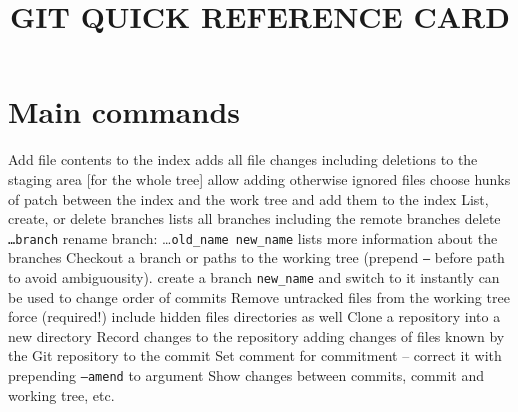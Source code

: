 
\def\cmdOptLl#1#2{
    \hsize=8.5cm
    \vbox {
        \hbox{
      \hskip 15pt
      \noindent\cmd{\tt--#1}
      \hfil
        }%
        \hskip 70pt  %
        \hbox to 5.9cm {%
            \hfuzz = 5pt
            \hfil
            \hsize=5.9cm
            \vtop{
                {#2}
            }}
    }%
    \par
    \vskip 0.14cm
}


\title{GIT QUICK REFERENCE CARD}

\shortintro

\section{Main commands}
	{Add file contents to the index}
	{adds all file changes including deletions to the staging area [for the whole tree]}
	{allow adding otherwise ignored files}
	{choose hunks of patch between the index and the work tree and add them to the index}
	{List, create, or delete branches}
	{lists all branches including the remote branches}
	{delete {\tt \dots branch}}
	{rename branch: \dots {\tt old\_name new\_name}}
	{lists more information about the branches}
	{Checkout a branch or paths to the working tree (prepend {\tt --} before path to avoid ambiguousity).}
	{create a branch {\tt new\_name} and switch to it instantly}
	{can be used to change order of commits}
	{Remove untracked files from the working tree}
	{force (required!)}
	{include hidden files}
	{directories as well}
	{Clone a repository into a new directory}
	{Record changes to the repository}
	{adding changes of files known by the Git repository to the commit}
	{Set comment for commitment -- correct it with prepending {\tt --amend} to argument}
	{Show changes between commits, commit and working tree, etc.}

